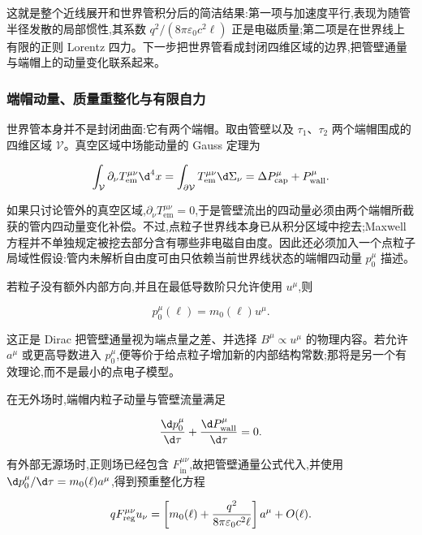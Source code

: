 这就是整个近线展开和世界管积分后的简洁结果:第一项与加速度平行,表现为随管半径发散的局部惯性,其系数 $q^2/(8\pi\varepsilon_0c^2\ell)$ 正是电磁质量;第二项是在世界线上有限的正则 Lorentz 四力。下一步把世界管看成封闭四维区域的边界,把管壁通量与端帽上的动量变化联系起来。

\subsubsection{端帽动量、质量重整化与有限自力}

世界管本身并不是封闭曲面:它有两个端帽。取由管壁以及 $\tau_1$、$\tau_2$ 两个端帽围成的四维区域 $\mathcal V$。真空区域中场能动量的 Gauss 定理为

\begin{equation*}
 \int_{\mathcal V}\partial_\nu T_{\mathrm{em}}^{\mu\nu}\d^4x
 =\int_{\partial\mathcal V}T_{\mathrm{em}}^{\mu\nu}\d\Sigma_\nu
 =\Delta P_{\mathrm{cap}}^\mu+P_{\mathrm{wall}}^\mu.
\end{equation*}

如果只讨论管外的真空区域,$\partial_\nu T_{\mathrm{em}}^{\mu\nu}=0$,于是管壁流出的四动量必须由两个端帽所截获的管内四动量变化补偿。不过,点粒子世界线本身已从积分区域中挖去;Maxwell 方程并不单独规定被挖去部分含有哪些非电磁自由度。因此还必须加入一个点粒子局域性假设:管内未解析自由度可由只依赖当前世界线状态的端帽四动量 $p_0^\mu$ 描述。

若粒子没有额外内部方向,并且在最低导数阶只允许使用 $u^\mu$,则

\begin{equation*}
 p_0^\mu(\ell)=m_0(\ell)u^\mu.
\end{equation*}

这正是 Dirac 把管壁通量视为端点量之差、并选择 $B^\mu\propto u^\mu$ 的物理内容。若允许 $a^\mu$ 或更高导数进入 $p_0^\mu$,便等价于给点粒子增加新的内部结构常数;那将是另一个有效理论,而不是最小的点电子模型。

在无外场时,端帽内粒子动量与管壁流量满足

\begin{equation*}
 {\d p_0^\mu\over\d\tau}
 +{\d P_{\mathrm{wall}}^\mu\over\d\tau}=0.
\end{equation*}

有外部无源场时,正则场已经包含 $F_{\mathrm{in}}^{\mu\nu}$,故把管壁通量公式代入,并使用 ${\d p_0^\mu/\d\tau}=m_0(\ell)a^\mu$,得到预重整化方程

\begin{equation*}
 qF_{\mathrm{reg}}^{\mu\nu}u_\nu
 =\left[
 m_0(\ell)
 +{q^2\over8\pi\varepsilon_0c^2\ell}
 \right]a^\mu+O(\ell).
\end{equation*}

